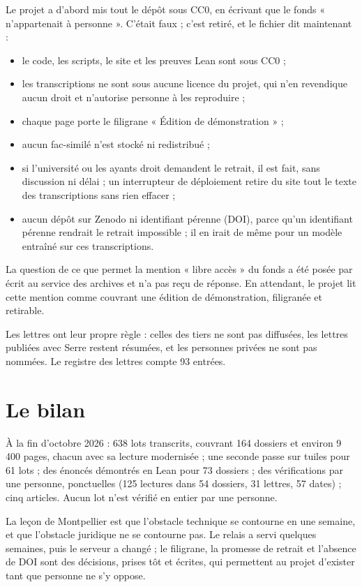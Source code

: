 Le projet a d'abord mis tout le dépôt sous CC0, en écrivant que le fonds « n'appartenait à
personne ». C'était faux ; c'est retiré, et le fichier  dit maintenant :
\begin{itemize}
  \item le code, les scripts, le site et les preuves Lean sont sous CC0 ;
  \item les transcriptions ne sont sous aucune licence du projet, qui n'en revendique aucun
        droit et n'autorise personne à les reproduire ;
  \item chaque page porte le filigrane « Édition de démonstration » ;
  \item aucun fac-similé n'est stocké ni redistribué ;
  \item si l'université ou les ayants droit demandent le retrait, il est fait, sans
        discussion ni délai ; un interrupteur de déploiement retire du site tout le texte
        des transcriptions sans rien effacer ;
  \item aucun dépôt sur Zenodo ni identifiant pérenne (DOI), parce qu'un identifiant
        pérenne rendrait le retrait impossible ; il en irait de même pour un modèle
        entraîné sur ces transcriptions.
\end{itemize}
La question de ce que permet la mention « libre accès » du fonds a été posée par écrit au
service des archives et n'a pas reçu de réponse. En attendant, le projet lit cette mention
comme couvrant une édition de démonstration, filigranée et retirable.

Les lettres ont leur propre règle : celles des tiers ne sont pas diffusées, les lettres
publiées avec Serre restent résumées, et les personnes privées ne sont pas nommées. Le
registre des lettres compte 93 entrées.

\section{Le bilan}

À la fin d'octobre 2026 : 638 lots transcrits, couvrant 164 dossiers et environ 9\,400
pages, chacun avec sa lecture modernisée ; une seconde passe sur tuiles pour 61 lots ; des
énoncés démontrés en Lean pour 73 dossiers ; des vérifications par une personne, ponctuelles
(125 lectures dans 54 dossiers, 31 lettres, 57 dates) ; cinq articles. Aucun lot n'est
vérifié en entier par une personne.

\begin{exemple}
La leçon de Montpellier est que l'obstacle technique se contourne en une semaine, et que
l'obstacle juridique ne se contourne pas. Le relais a servi quelques semaines, puis le
serveur a changé ; le filigrane, la promesse de retrait et l'absence de DOI sont des
décisions, prises tôt et écrites, qui permettent au projet d'exister tant que personne ne
s'y oppose.
\end{exemple}

